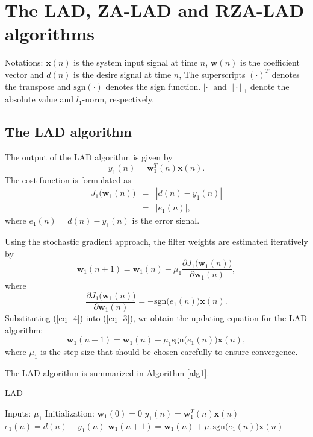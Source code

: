 \documentclass[conference]{IEEEtran}
\begin{document}
\section {The LAD, ZA-LAD and RZA-LAD algorithms}
\label{S2}
Notations:  $\mathbf{x}(n)$ is the system input signal at time $n$, $\mathbf{w}(n)$ is the coefficient vector and  $d(n)$ is the desire signal at time $n$, The superscripts $(\cdot)^T$ denotes the transpose and $\textrm{sgn}(\cdot)$ denotes the sign function. $|\cdot|$ and $||\cdot||_1$ denote the absolute value and  $l_1$-norm, respectively.
\subsection {The LAD algorithm}
\label{S2-1}
The output of the LAD algorithm is given by
\begin{equation}
\label{eq_1}
y_1(n) = \mathbf{w}_1^T(n)\mathbf{x}(n).
\end{equation}
The cost function is formulated as
\setlength\arraycolsep{0.1em}
\begin{eqnarray}
\label{eq_2}
J_1\big(\mathbf{w}_1(n)\big)  &=&   \left|d(n) - y_1(n)  \right| \nonumber\\
&=& \left| e_1(n) \right|,
\end{eqnarray}
where $e_1(n) = d(n) - y_1(n)$ is the error signal.

Using the stochastic gradient approach, the filter weights are estimated iteratively by
\begin{equation}
\label{eq_3}
\mathbf{w}_1(n+1)=\mathbf{w}_1(n) - \mu_1\frac{ \partial J_1\big(\mathbf{w}_1(n)\big)}{ \partial \mathbf{w}_1(n)},
\end{equation}
where 
\begin{equation}
\label{eq_4}
\frac{ \partial J_1\big(\mathbf{w}_1(n)\big)}{ \partial \mathbf{w}_1(n)} = -\textrm{sgn} \big(e_1(n)\big)\mathbf{x}(n).
\end{equation}
Substituting (\ref{eq_4}) into (\ref{eq_3}), we obtain the updating equation for the LAD algorithm:
\begin{equation}
\label{eq_5}
\mathbf{w}_1(n+1)=\mathbf{w}_1(n)+ \mu_1 \textrm{sgn} \big(e_1(n)\big)\mathbf{x}(n),
\end{equation}
where $\mu_1$ is the step size that should be chosen carefully to ensure convergence.

The LAD algorithm is summarized in Algorithm \ref{alg1}.
\begin{algorithm}[!h]
\caption{LAD}
\label{alg1}
\begin{algorithmic}
\STATE   Inputs:  $\mu_1$
\STATE  Initialization:  $\mathbf{w}_1(0)=0$
\STATE $y_1(n)  =  \mathbf{w}^T_1(n)\mathbf{x}(n)$
\STATE $e_1(n)  = d(n) - y_1(n)$
\STATE $\mathbf{w}_1(n+1) = \mathbf{w}_1(n)+\mu_1\textrm{sgn}\big(e_1(n)\big)\mathbf{x}(n)$
\ENDFOR
\end{algorithmic}
\end{algorithm}
\end{document}
